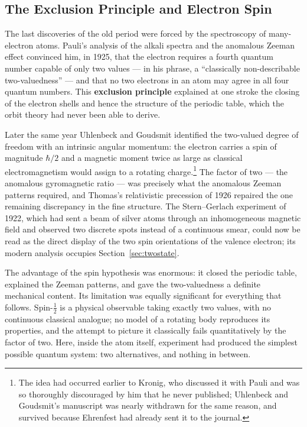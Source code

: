 \subsection{The Exclusion Principle and Electron Spin}
\label{subsec:spin}
The last discoveries of the old period were forced by the spectroscopy of many-electron atoms. Pauli's analysis of the alkali spectra and the anomalous Zeeman effect convinced him, in 1925, that the electron requires a fourth quantum number capable of only two values --- in his phrase, a ``classically non-describable two-valuedness'' --- and that no two electrons in an atom may agree in all four quantum numbers. This \textbf{exclusion principle} explained at one stroke the closing of the electron shells and hence the structure of the periodic table, which the orbit theory had never been able to derive.

Later the same year Uhlenbeck and Goudsmit identified the two-valued degree of freedom with an intrinsic angular momentum: the electron carries a spin of magnitude $\hbar/2$ and a magnetic moment twice as large as classical electromagnetism would assign to a rotating charge.\footnote{The idea had occurred earlier to Kronig, who discussed it with Pauli and was so thoroughly discouraged by him that he never published; Uhlenbeck and Goudsmit's manuscript was nearly withdrawn for the same reason, and survived because Ehrenfest had already sent it to the journal.} The factor of two --- the anomalous gyromagnetic ratio --- was precisely what the anomalous Zeeman patterns required, and Thomas's relativistic precession of 1926 repaired the one remaining discrepancy in the fine structure. The Stern--Gerlach experiment of 1922, which had sent a beam of silver atoms through an inhomogeneous magnetic field and observed two discrete spots instead of a continuous smear, could now be read as the direct display of the two spin orientations of the valence electron; its modern analysis occupies Section~\ref{sec:twostate}.

The advantage of the spin hypothesis was enormous: it closed the periodic table, explained the Zeeman patterns, and gave the two-valuedness a definite mechanical content. Its limitation was equally significant for everything that follows. Spin-$\tfrac12$ is a physical observable taking exactly two values, with no continuous classical analogue; no model of a rotating body reproduces its properties, and the attempt to picture it classically fails quantitatively by the factor of two. Here, inside the atom itself, experiment had produced the simplest possible quantum system: two alternatives, and nothing in between.

